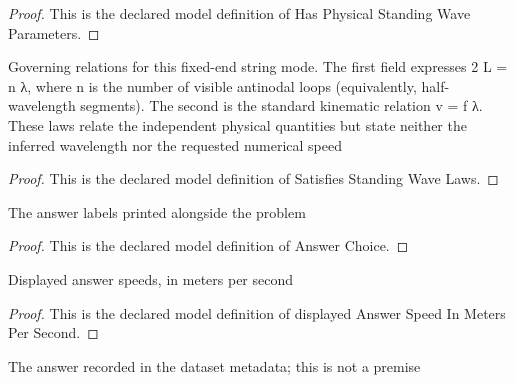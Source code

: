 \begin{proof}
  This is the declared model definition of Has Physical Standing Wave Parameters.
\end{proof}
\begin{definition}
  \label{def:physics:phyx-mini-0176:phyxminiproblems-problemphyxmini0176-satisfiesstandingwavelaws}
  Governing relations for this fixed-end string mode. The first field expresses 2 L = n λ, where n is the number of visible antinodal loops (equivalently, half-wavelength segments). The second is the standard kinematic relation v = f λ. These laws relate the independent physical quantities but state neither the inferred wavelength nor the requested numerical speed
\end{definition}
\begin{proof}
  This is the declared model definition of Satisfies Standing Wave Laws.
\end{proof}
\begin{definition}
  \label{def:physics:phyx-mini-0176:phyxminiproblems-problemphyxmini0176-answerchoice}
  The answer labels printed alongside the problem
\end{definition}
\begin{proof}
  This is the declared model definition of Answer Choice.
\end{proof}
\begin{definition}
  \label{def:physics:phyx-mini-0176:phyxminiproblems-problemphyxmini0176-displayedanswerspeedinmeterspersecond}
  Displayed answer speeds, in meters per second
\end{definition}
\begin{proof}
  This is the declared model definition of displayed Answer Speed In Meters Per Second.
\end{proof}
\begin{definition}
  \label{def:physics:phyx-mini-0176:phyxminiproblems-problemphyxmini0176-recordeddatasetanswer}
  The answer recorded in the dataset metadata; this is not a premise
\end{definition}
